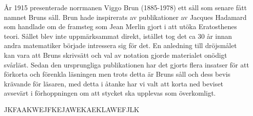
År 1915 presenterade norrmanen Viggo Brun (1885-1978) ett såll som senare fått namnet Bruns såll. Brun hade inspirerats av publikationer av Jacques Hadamard som handlade om de framsteg som Jean Merlin gjort i att utöka Eratosthenes teori. Sållet blev inte uppmärksammat direkt, istället tog det ca 30 år innan andra matematiker började intressera sig för det. En anledning till dröjsmålet kan vara att Bruns skrivsätt och val av notation gjorde materialet onödigt svårläst. Sedan den ursprungliga publikationen har det gjorts flera insatser för att förkorta och förenkla läsningen men trots detta är Bruns såll och dess bevis krävande för läsaren, med detta i åtanke har vi valt att korta ned beviset avsevärt i förhoppningen om att stycket ska upplevas som överkomligt.

JKFAAKWEJFKEJAWEKAEKLAWEFJLK